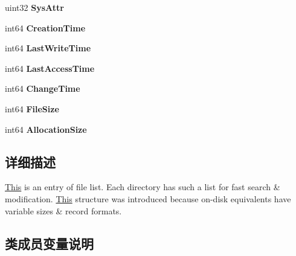 \begin{DoxyCompactItemize}
uint32 {\bfseries Sys\+Attr}
\item 
\mbox{\label{struct___d_i_r___i_n_d_e_x___i_t_e_m_a11ce2f82641818a72b55893a281af86c}} 
int64 {\bfseries Creation\+Time}
\item 
\mbox{\label{struct___d_i_r___i_n_d_e_x___i_t_e_m_ac9c5577b599285a2e3e93f4d5f5a0929}} 
int64 {\bfseries Last\+Write\+Time}
\item 
\mbox{\label{struct___d_i_r___i_n_d_e_x___i_t_e_m_a2d270fdd20050f6455729bc813458e80}} 
int64 {\bfseries Last\+Access\+Time}
\item 
\mbox{\label{struct___d_i_r___i_n_d_e_x___i_t_e_m_ae01769a3e1858b301e86cd22aa898fb2}} 
int64 {\bfseries Change\+Time}
\item 
\mbox{\label{struct___d_i_r___i_n_d_e_x___i_t_e_m_acf5857b7e9986e0dd937a0da73c7810a}} 
int64 {\bfseries File\+Size}
\item 
\mbox{\label{struct___d_i_r___i_n_d_e_x___i_t_e_m_a0eae0d2ddaecf857c1c41e681e933eba}} 
int64 {\bfseries Allocation\+Size}
\end{DoxyCompactItemize}


\subsection{详细描述}
\hyperlink{namespace_this}{This} is an entry of file list. Each directory has such a list for fast search \& modification. \hyperlink{namespace_this}{This} structure was introduced because on-\/disk equivalents have variable sizes \& record formats. 

\subsection{类成员变量说明}
\mbox{\label{struct___d_i_r___i_n_d_e_x___i_t_e_m_a40f22d199c70d06e1635cbe6dcfb89a2}} 
